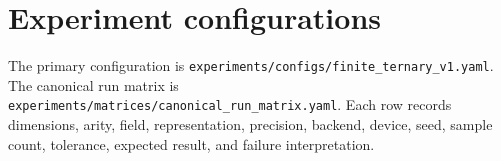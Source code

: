 \section{Experiment configurations}

The primary configuration is \texttt{experiments/configs/finite\_ternary\_v1.yaml}. The canonical run matrix is \texttt{experiments/matrices/canonical\_run\_matrix.yaml}. Each row records dimensions, arity, field, representation, precision, backend, device, seed, sample count, tolerance, expected result, and failure interpretation.
